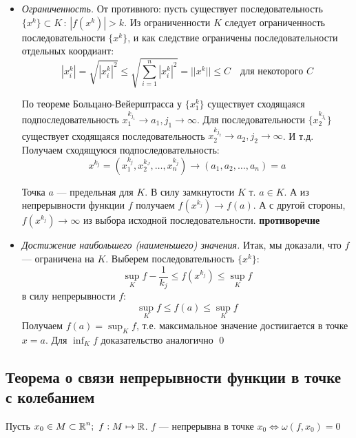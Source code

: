 \documentclass[a4paper]{article}
\begin{document}
\proof
\begin{itemize}
    \item \textit{Ограниченность.} От противного: пусть существует последовательность $\{x^k\} \subset K \,:\, |f(x^k)| > k$. Из ограниченности $K$ следует ограниченность последовательности $\{x^k\}$, и как следствие ограничены последовательности отдельных коордиант:
    \begin{equation*}
        |x_i^k| = \sqrt{|x_i^k|^2} \leqslant \sqrt{\sum_{i=1}^n|x_i^k|^2} = ||x^k|| \leqslant C \quad \text{для некоторого }C
    \end{equation*}

    По теореме Больцано-Вейерштрасса у $\{x_1^k\}$ существует сходящаяся подпоследовательность $x_1^{k_{j_1}} \to a_1, j_1 \to \infty$. Для последовательности $\{x_2^{k_{j_1}}\}$ существует сходящаяся последовательность $x_2^{k_{j_2}} \to a_2, j_2 \to \infty$. И т.д. Получаем сходящуюся подпоследовательность:
    \begin{equation*}
        x^{k_j} = (x_1^{k_j}, x_2^{k_J}, \ldots, x_n^{k_j})\to(a_1, a_2, \ldots, a_n) = a
    \end{equation*}

    Точка $a$ — предельная для $K$. В силу замкнутости $K$ т. $a\in K$. А из непрерывности функции $f$ получаем $f(x^{k_j}) \to f(a)$. А с другой стороны, $f(x^{k_j})\to\infty$ из выбора исходной последовательности. \textbf{противоречие}

    \item \textit{Достижение наибольшего (наименьшего) значения.} Итак, мы доказали, что $f$ — ограничена на $K$. Выберем последовательность $\{x^k\}$:
    \begin{equation*}
        \sup_K f - \frac{1}{k_j} \le f(x^{k_j}) \le \sup_K f
    \end{equation*}
    в силу непрерывности $f$:
    \begin{equation*}
        \sup_K f \le f(a) \le \sup_K f
    \end{equation*}
    Получаем $f(a) = \displaystyle\sup_K f$, т.е. максимальное значение достиигается в точке $x = a$. Для $\displaystyle\inf_K f$ доказательство аналогично
    \qed
\end{itemize}

\subsection{Теорема о связи непрерывности функции в точке с колебанием}
\theorem Пусть $x_0 \in M \subset \operatorname{\mathbb{R}}^n; \,\, f: M\mapsto\operatorname{\mathbb{R}}$. $f$ — непрерывна в точке $x_0 \iff \omega(f, x_0) = 0$
\end{document}
